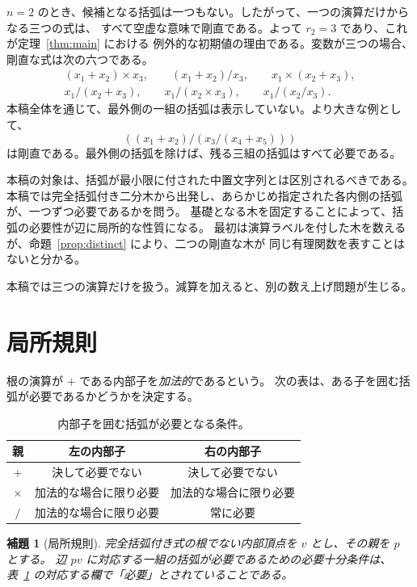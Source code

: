 \documentclass[11pt]{ltjsarticle}
\newtheorem{lemma}[theorem]{補題}
\begin{document}
$n=2$ のとき、候補となる括弧は一つもない。したがって、一つの演算だけからなる三つの式は、
すべて空虚な意味で剛直である。よって $r_2=3$ であり、これが定理~\ref{thm:main} における
例外的な初期値の理由である。変数が三つの場合、剛直な式は次の六つである。
\[
\begin{gathered}
 (x_1+x_2)\times x_3,\qquad
 (x_1+x_2)/x_3,\qquad
 x_1\times(x_2+x_3),\\
 x_1/(x_2+x_3),\qquad
 x_1/(x_2\times x_3),\qquad
 x_1/(x_2/x_3).
\end{gathered}
\]
本稿全体を通じて、最外側の一組の括弧は表示していない。より大きな例として、
\[
 ((x_1+x_2)/(x_3/(x_4+x_5)))
\]
は剛直である。最外側の括弧を除けば、残る三組の括弧はすべて必要である。

本稿の対象は、括弧が最小限に付された中置文字列とは区別されるべきである。
本稿では完全括弧付き二分木から出発し、あらかじめ指定された各内側の括弧が、一つずつ必要であるかを問う。
基礎となる木を固定することによって、括弧の必要性が辺に局所的な性質になる。
最初は演算ラベルを付した木を数えるが、命題~\ref{prop:distinct} により、二つの剛直な木が
同じ有理関数を表すことはないと分かる。

本稿では三つの演算だけを扱う。減算を加えると、別の数え上げ問題が生じる。

\section{局所規則}

根の演算が $+$ である内部子を\emph{加法的}であるという。
次の表は、ある子を囲む括弧が必要であるかどうかを決定する。

\begin{table}[ht]
\centering
\small
\begin{tabular}{ccc}
\toprule
親 & 左の内部子 & 右の内部子 \\
\midrule
$+$      & 決して必要でない & 決して必要でない \\
$\times$ & 加法的な場合に限り必要 & 加法的な場合に限り必要 \\
$/$      & 加法的な場合に限り必要 & 常に必要 \\
\bottomrule
\end{tabular}
\caption{内部子を囲む括弧が必要となる条件。}
\label{tab:local}
\end{table}

\begin{lemma}[局所規則]\label{lem:local}
完全括弧付き式の根でない内部頂点を $v$ とし、その親を $p$ とする。
辺 $pv$ に対応する一組の括弧が必要であるための必要十分条件は、
表~\ref{tab:local} の対応する欄で「必要」とされていることである。
\end{lemma}
\end{document}
